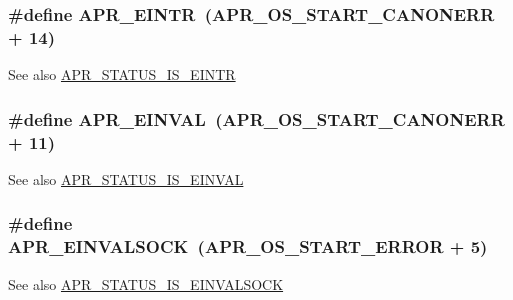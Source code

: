 \subsubsection[{\texorpdfstring{A\+P\+R\+\_\+\+E\+I\+N\+TR}{APR_EINTR}}]{\setlength{\rightskip}{0pt plus 5cm}\#define A\+P\+R\+\_\+\+E\+I\+N\+TR~({\bf A\+P\+R\+\_\+\+O\+S\+\_\+\+S\+T\+A\+R\+T\+\_\+\+C\+A\+N\+O\+N\+E\+RR} + 14)}\hypertarget{group___a_p_r___error_gaee1ce306c0ebf1701b34172310aa1bd5}{}\label{group___a_p_r___error_gaee1ce306c0ebf1701b34172310aa1bd5}
\begin{DoxySeeAlso}{See also}
\hyperlink{group___a_p_r___s_t_a_t_u_s___i_s_gae626ecee1818f43bd50531ab2b81dfab}{A\+P\+R\+\_\+\+S\+T\+A\+T\+U\+S\+\_\+\+I\+S\+\_\+\+E\+I\+N\+TR} 
\end{DoxySeeAlso}
\subsubsection[{\texorpdfstring{A\+P\+R\+\_\+\+E\+I\+N\+V\+AL}{APR_EINVAL}}]{\setlength{\rightskip}{0pt plus 5cm}\#define A\+P\+R\+\_\+\+E\+I\+N\+V\+AL~({\bf A\+P\+R\+\_\+\+O\+S\+\_\+\+S\+T\+A\+R\+T\+\_\+\+C\+A\+N\+O\+N\+E\+RR} + 11)}\hypertarget{group___a_p_r___error_gae3ffc41994444e71ce522c036ca1d9a4}{}\label{group___a_p_r___error_gae3ffc41994444e71ce522c036ca1d9a4}
\begin{DoxySeeAlso}{See also}
\hyperlink{group___a_p_r___s_t_a_t_u_s___i_s_ga329002c8d72aa3b8aa851e490ac39044}{A\+P\+R\+\_\+\+S\+T\+A\+T\+U\+S\+\_\+\+I\+S\+\_\+\+E\+I\+N\+V\+AL} 
\end{DoxySeeAlso}
\subsubsection[{\texorpdfstring{A\+P\+R\+\_\+\+E\+I\+N\+V\+A\+L\+S\+O\+CK}{APR_EINVALSOCK}}]{\setlength{\rightskip}{0pt plus 5cm}\#define A\+P\+R\+\_\+\+E\+I\+N\+V\+A\+L\+S\+O\+CK~({\bf A\+P\+R\+\_\+\+O\+S\+\_\+\+S\+T\+A\+R\+T\+\_\+\+E\+R\+R\+OR} + 5)}\hypertarget{group___a_p_r___error_ga548032b79ce0671d9986db0654858812}{}\label{group___a_p_r___error_ga548032b79ce0671d9986db0654858812}
\begin{DoxySeeAlso}{See also}
\hyperlink{group___a_p_r___s_t_a_t_u_s___i_s_gae2f8d3d1d43b5418ed57143d2b4566a4}{A\+P\+R\+\_\+\+S\+T\+A\+T\+U\+S\+\_\+\+I\+S\+\_\+\+E\+I\+N\+V\+A\+L\+S\+O\+CK} 
\end{DoxySeeAlso}
